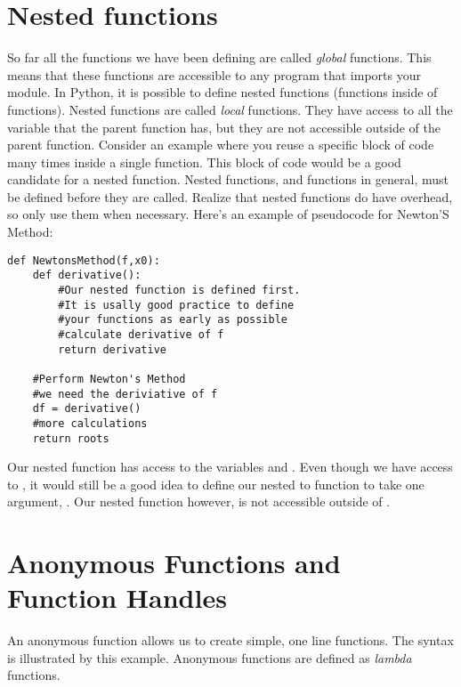 

\section*{Nested functions}
So far all the functions we have been defining are called \emph{global} functions.  This means that these functions are accessible to any program that imports your module.  In Python, it is possible to define nested functions (functions inside of functions).  Nested functions are called \emph{local} functions.  They have access to all the variable that the parent function has, but they are not accessible outside of the parent function.  Consider an example where you reuse a specific block of code many times inside a single function.  This block of code would be a good candidate for a nested function.  Nested functions, and functions in general, must be defined before they are called. Realize that nested functions do have overhead, so only use them when necessary.  Here's an example of pseudocode for Newton'S Method:

\begin{lstlisting}
def NewtonsMethod(f,x0):   
    def derivative():
        #Our nested function is defined first.
        #It is usally good practice to define
        #your functions as early as possible
        #calculate derivative of f
        return derivative
    
    #Perform Newton's Method
    #we need the deriviative of f
    df = derivative()
    #more calculations
    return roots
\end{lstlisting}

Our nested function  has access to the variables  and .  Even though we have access to , it would still be a good idea to define our nested to function to take one argument, .  Our nested function  however, is not accessible outside of .

\section*{Anonymous Functions and Function Handles}
An anonymous function allows us to create simple, one line functions. The syntax is illustrated by this example.  Anonymous functions are defined as \emph{lambda} functions.

